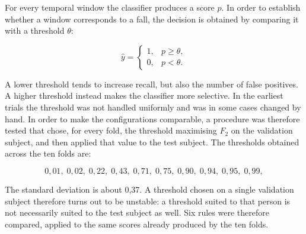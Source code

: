 For every temporal window the classifier produces a score $p$. In order to establish whether a window corresponds to a fall, the decision is obtained by comparing it with a threshold $\theta$:

\[
\hat{y} =
\begin{cases}
1, & p \geq \theta,\\
0, & p < \theta.
\end{cases}
\]

A lower threshold tends to increase recall, but also the number of false positives. A higher threshold instead makes the classifier more selective.
In the earliest trials the threshold was not handled uniformly and was in some cases changed by hand. In order to make the configurations comparable, a procedure was therefore tested that chose, for every fold, the threshold maximising $F_2$ on the validation subject, and then applied that value to the test subject. The thresholds obtained across the ten folds are:

\[
0{,}01,\;
0{,}02,\;
0{,}22,\;
0{,}43,\;
0{,}71,\;
0{,}75,\;
0{,}90,\;
0{,}94,\;
0{,}95,\;
0{,}99,
\]

The standard deviation is about 0,37. A threshold chosen on a single validation subject therefore turns out to be unstable: a threshold suited to that person is not necessarily suited to the test subject as well. Six rules were therefore compared, applied to the same scores already produced by the ten folds.

\begin{table}[ht]
\centering
\caption{Comparison between the six rules used to choose the threshold.}
\label{tab:soglie}
\end{table}

